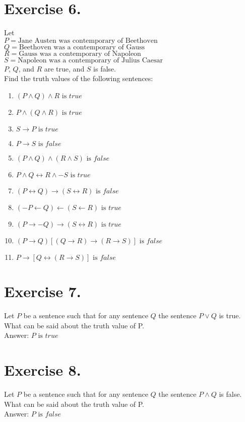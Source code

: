 \documentclass{article}
\begin{document}
\section*{Exercise 6.}
Let\\
$P = \text{Jane Austen was contemporary of Beethoven}$\\
$Q = \text{Beethoven was a contemporary of Gauss}$\\
$R = \text{Gauss was a contemporary of Napoleon}$\\
$S = \text{Napoleon was a contemporary of Julius Caesar}$\\
$P$, $Q$, and $R$ are true, and $S$ is false.\\
Find the truth values of the following sentences:
\medskip
\begin{enumerate}[label=(\alph*)]
\item $(P \wedge Q) \wedge R \text{ is } true$
\item $P \wedge (Q \wedge R) \text{ is } true$
\item $S \rightarrow P \text{ is } true$
\item $P \rightarrow S \text{ is } false$
\item $(P \wedge Q) \wedge (R \wedge S) \text{ is } false$
\item $P \wedge Q \leftrightarrow R \wedge -S \text{ is } true$
\item $(P \leftrightarrow Q) \rightarrow (S \leftrightarrow R) \text{ is } false$
\item $(-P \leftarrow Q) \leftarrow (S \leftarrow R) \text{ is } true$
\item $(P \rightarrow -Q) \rightarrow (S \leftrightarrow R) \text{ is } true$
\item $(P \rightarrow Q) [(Q \rightarrow R) \rightarrow (R \rightarrow S)] \text{ is } false$
\item $P \rightarrow [Q \leftrightarrow (R \rightarrow S)] \text{ is } false$
\end{enumerate}

\section*{Exercise 7.}
Let $P$ be a sentence such that for any sentence $Q$ the sentence $P \vee Q$ is true.\\
What can be said about the truth value of P.\\
Answer: $P \text{ is } true$

\section*{Exercise 8.}
Let $P$ be a sentence such that for any sentence $Q$ the sentence $P \wedge Q$ is false.\\
What can be said about the truth value of P.\\
Answer: $P \text{ is } false$
\end{document}
